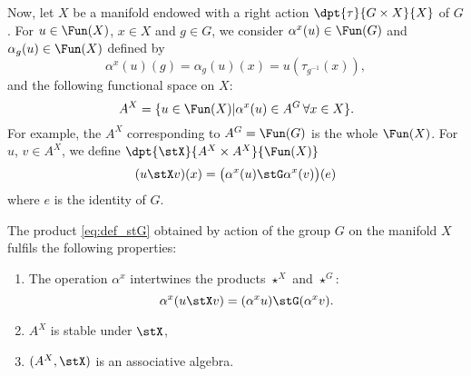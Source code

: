 Now, let $X$ be a manifold endowed with a right action  $\dpt{\tau}{G\times X}{X}$ of $G$.  For $u\in\Fun(X)$, $x\in X$ and $g\in G$, we consider $\alpha^x(u)\in\Fun(G)$ and $\alpha_g(u)\in\Fun(X)$ defined by
\begin{equation}		\label{EqDefalphaxu}
   \alpha^x(u)(g)=\alpha_g(u)(x)=u(\tau_{g^{-1}}(x)),
\end{equation}
and the following functional space on $X$:
\[
   A^X=\{u\in\Fun(X)|\alpha^x(u)\in A^G\,\forall x\in X\}.
\]
For example, the $A^X$ corresponding to $A^G=\Fun(G)$ is the whole $\Fun(X)$.  For $u$, $v\in A^X$, we define $\dpt{\stX}{A^X\times A^X}{\Fun(X)}$
\begin{equation}\label{eq:def_stG}
   (u\stX v)(x)=\big(\alpha^x(u)\stG \alpha^x(v)\big)(e)
\end{equation}
where $e$ is the identity of $G$.


\begin{theorem}
The product \eqref{eq:def_stG} obtained by action of the group $G$ on the manifold $X$ fulfils the following properties:
\begin{enumerate}
\item\label{itemthostG} The operation $\alpha^x$ intertwines the products $\star^X$ and $\star^G$:
\[
   \alpha^x(u\stX v)=(\alpha^xu)\stG(\alpha^xv).
\]

\item $A^X$ is stable under $\stX$,
\item $(A^X,\stX)$ is an associative algebra.
\end{enumerate}
\end{theorem}


